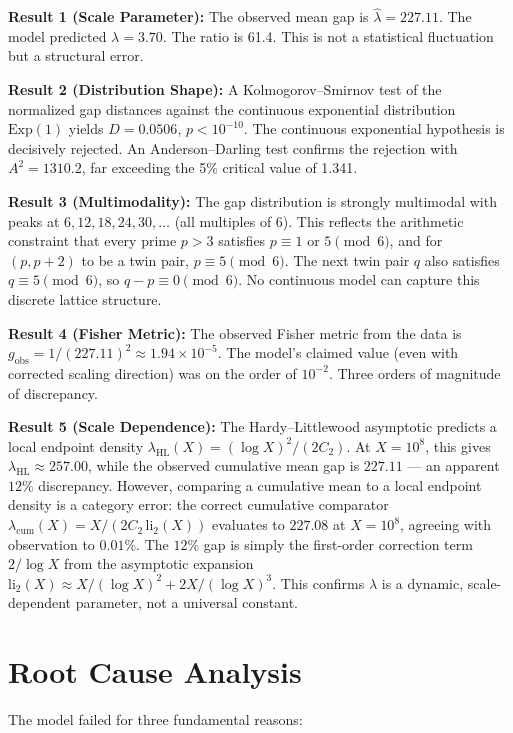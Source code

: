 \documentclass[11pt]{article}
\begin{document}
\noindent \textbf{Result 1 (Scale Parameter):} The observed mean gap is $\hat{\lambda} = 227.11$. The model predicted $\lambda = 3.70$. The ratio is 61.4. This is not a statistical fluctuation but a structural error.

\noindent \textbf{Result 2 (Distribution Shape):} A Kolmogorov--Smirnov test of the normalized gap distances against the continuous exponential distribution $\text{Exp}(1)$ yields $D = 0.0506$, $p < 10^{-10}$. The continuous exponential hypothesis is decisively rejected. An Anderson--Darling test confirms the rejection with $A^2 = 1310.2$, far exceeding the 5\% critical value of 1.341.

\noindent \textbf{Result 3 (Multimodality):} The gap distribution is strongly multimodal with peaks at $6, 12, 18, 24, 30, \ldots$ (all multiples of 6). This reflects the arithmetic constraint that every prime $p > 3$ satisfies $p \equiv 1$ or $5 \pmod{6}$, and for $(p, p+2)$ to be a twin pair, $p \equiv 5 \pmod{6}$. The next twin pair $q$ also satisfies $q \equiv 5 \pmod{6}$, so $q - p \equiv 0 \pmod{6}$. No continuous model can capture this discrete lattice structure.

\noindent \textbf{Result 4 (Fisher Metric):} The observed Fisher metric from the data is $g_{\text{obs}} = 1/(227.11)^2 \approx 1.94 \times 10^{-5}$. The model's claimed value (even with corrected scaling direction) was on the order of $10^{-2}$. Three orders of magnitude of discrepancy.

\noindent \textbf{Result 5 (Scale Dependence):} The Hardy--Littlewood asymptotic predicts a local endpoint density $\lambda_{\mathrm{HL}}(X) = (\log X)^2/(2C_2)$. At $X = 10^8$, this gives $\lambda_{\mathrm{HL}} \approx 257.00$, while the observed cumulative mean gap is $227.11$ — an apparent $12\%$ discrepancy. However, comparing a cumulative mean to a local endpoint density is a category error: the correct cumulative comparator $\lambda_{\mathrm{cum}}(X) = X/(2C_2\,\mathrm{li}_2(X))$ evaluates to $227.08$ at $X = 10^8$, agreeing with observation to $0.01\%$. The $12\%$ gap is simply the first-order correction term $2/\log X$ from the asymptotic expansion $\mathrm{li}_2(X) \approx X/(\log X)^2 + 2X/(\log X)^3$. This confirms $\lambda$ is a dynamic, scale-dependent parameter, not a universal constant.

\section{Root Cause Analysis}
The model failed for three fundamental reasons:
\end{document}
